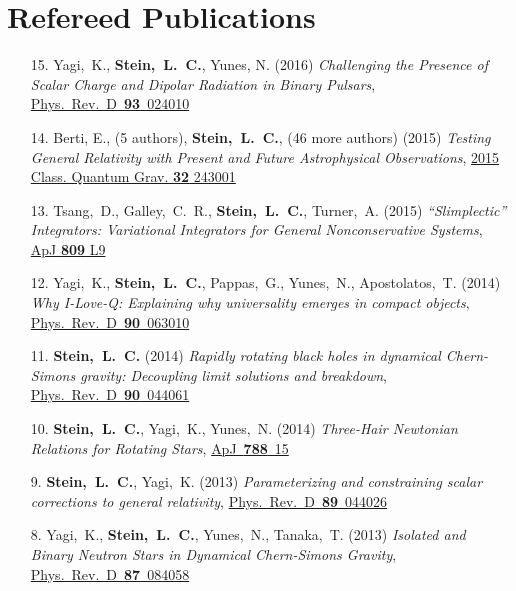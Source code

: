 \section{\sc Refereed Publications}
\begin{enumerate}
\item[{15.}] Yagi,~K., {\bf Stein,~L.~C.}, Yunes, N. (2016)
  {\it Challenging the Presence of Scalar Charge and Dipolar Radiation in Binary Pulsars},
  \href{http://dx.doi.org/doi:10.1103/PhysRevD.93.024010}{Phys.~Rev.~D~{\bf 93}~024010}
\item[{14.}] Berti, E., (5 authors), {\bf Stein,~L.~C.}, (46 more authors) (2015)
  {\it Testing General Relativity with Present and Future
    Astrophysical Observations},
  \href{http://dx.doi.org/10.1088/0264-9381/32/24/243001}{2015 Class. Quantum Grav. {\bf 32} 243001}
\item[{13.}] Tsang,~D., Galley,~C.~R., {\bf Stein,~L.~C.}, Turner,~A. (2015)
  {\it ``Slimplectic'' Integrators: Variational Integrators for General Nonconservative Systems},
  \href{http://dx.doi.org/10.1088/2041-8205/809/1/L9}{ApJ {\bf 809} L9}
\item[{12.}] Yagi,~K., {\bf Stein,~L.~C.}, Pappas,~G., Yunes,~N., Apostolatos,~T. (2014)
  {\it Why I-Love-Q: Explaining why universality emerges in compact objects},
  \href{http://dx.doi.org/10.1103/PhysRevD.90.063010}{Phys.~Rev.~D~{\bf 90}~063010}
\item[{11.}] {\bf Stein,~L.~C.} (2014)
  {\it Rapidly rotating black holes in dynamical Chern-Simons gravity:
    Decoupling limit solutions and breakdown},
  \href{http://dx.doi.org/10.1103/PhysRevD.90.044061}{Phys.~Rev.~D~{\bf 90}~044061}
\item[{10.}] {\bf Stein,~L.~C.}, Yagi,~K., Yunes,~N. (2014)
  {\it Three-Hair Newtonian Relations for Rotating Stars},
  \href{http://dx.doi.org/10.1088/0004-637X/788/1/15}{ApJ~{\bf 788}~15}
\item[{9.}] {\bf Stein,~L.~C.}, Yagi,~K. (2013)
  {\it Parameterizing and constraining scalar corrections to general relativity},
  \href{http://dx.doi.org/10.1103/PhysRevD.89.044026}{Phys.~Rev.~D~{\bf 89}~044026}
\item[{8.}] Yagi,~K., {\bf Stein,~L.~C.}, Yunes,~N., Tanaka,~T. (2013)
  {\it Isolated and Binary Neutron Stars in Dynamical Chern-Simons
    Gravity},
  \href{http://dx.doi.org/10.1103/PhysRevD.87.084058}{Phys.~Rev.~D~{\bf 87}~084058}

\end{enumerate}
